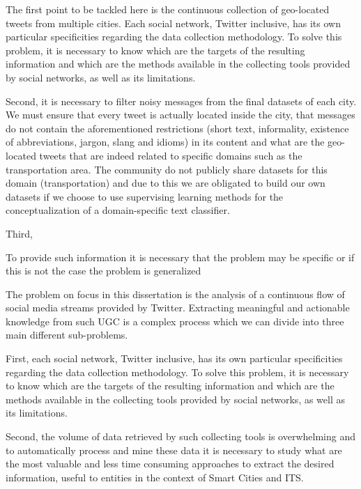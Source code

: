 The first point to be tackled here is the continuous collection of geo-located tweets from multiple cities. Each social network, Twitter inclusive, has its own particular specificities regarding the data collection methodology. To solve this problem, it is necessary to know which are the targets of the resulting information and which are the methods available in the collecting tools provided by social networks, as well as its limitations.

Second, it is necessary to filter noisy messages from the final datasets of each city. We must ensure that every tweet is actually located inside the city, that messages do not contain the aforementioned restrictions (short text, informality, existence of abbreviations, jargon, slang and idioms) in its content and what are the geo-located tweets that are indeed related to specific domains such as the transportation area. The community do not publicly share datasets for this domain (transportation) and due to this we are obligated to build our own datasets if we choose to use supervising learning methods for the conceptualization of a domain-specific text classifier.

Third, 

To provide such information it is necessary that the problem may be specific or if this is not the case the problem is generalized

\iffalse
The problem on focus in this dissertation is the analysis of a continuous flow of social media streams provided by Twitter. Extracting meaningful and actionable knowledge from such \gls{UGC} is a complex process which we can divide into three main different sub-problems.

First, each social network, Twitter inclusive, has its own particular specificities regarding the data collection methodology. To solve this problem, it is necessary to know which are the targets of the resulting information and which are the methods available in the collecting tools provided by social networks, as well as its limitations.

Second, the volume of data retrieved by such collecting tools is overwhelming and to automatically process and mine these data it is necessary to study what are the most valuable and less time consuming approaches to extract the desired information, useful to entities in the context of Smart Cities and \gls{ITS}.

